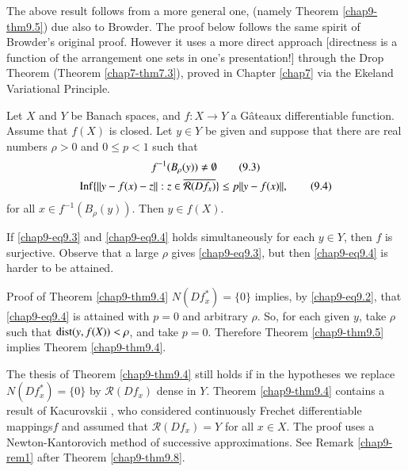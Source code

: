 The above result follows from a more general one, (namely Theorem
\ref{chap9-thm9.5}) due also to Browder. The proof below follows the
same spirit of Browder's original proof. However it uses a more direct
approach [directness is a function of the arrangement one sets in
  one's presentation!] through the Drop Theorem (Theorem
\ref{chap7-thm7.3}), proved in Chapter \ref{chap7} via the Ekeland
Variational Principle. 


\begin{theorem}\label{chap9-thm9.5}
Let $X$ and $Y$ be Banach spaces, and $f:X\to Y$ a G\^ateaux
differentiable function. Assume that $f(X)$ is closed. Let $y\in Y$ be
given and suppose that there are real numbers $\rho>0$ and $0\leq p<1$
such that
\begin{gather*}
f^{-1}(B_{\rho}(y))\neq \emptyset\tag{9.3}\label{chap9-eq9.3}\\
\operatorname{Inf}\{||y-f(x)-z||:z\in \overline{\mathcal{R}(Df_{x})}\}\leq
p||y-f(x)||,\tag{9.4}\label{chap9-eq9.4} 
\end{gather*}
for all $x\in f^{-1}(B_{\rho}(y))$. Then $y\in f(X)$.
\end{theorem}

\setcounter{remark}{0}
\begin{remark}\label{chap9-rem1}
If \eqref{chap9-eq9.3} and \eqref{chap9-eq9.4} holds simultaneously
for each $y\in Y$, then $f$ is surjective. Observe that a large $\rho$
gives \eqref{chap9-eq9.3}, but then \eqref{chap9-eq9.4} is harder to
be attained.
\end{remark}

\begin{remark}\label{chap9-rem2}
Proof of Theorem \ref{chap9-thm9.4} $N(Df^{*}_{x})=\{0\}$ implies, by
\eqref{chap9-eq9.2}, that \eqref{chap9-eq9.4} is attained with $p=0$
and arbitrary $\rho$. So, for each given $y$, take $\rho$ such that
$\operatorname{dist}(y,f(X))<\rho$, and take $p=0$. Therefore Theorem
\ref{chap9-thm9.5} implies Theorem \ref{chap9-thm9.4}.
\end{remark}

\begin{remark}\label{chap9-rem3}
The thesis of Theorem \ref{chap9-thm9.4} still holds if in the
hypotheses we replace $N(Df^{*}_{x})=\{0\}$ by $\mathcal{R}(Df_{x})$
dense in $Y$. Theorem \ref{chap9-thm9.4} contains a result of
Kacurovskii \cite{key35}, who considered continuously Frechet
differentiable mappings\pageoriginale $f$ and assumed that
$\mathcal{R}(Df_{x})=Y$ for all $x\in X$. The proof uses a
Newton-Kantorovich method of successive approximations. See Remark
\ref{chap9-rem1} after Theorem \ref{chap9-thm9.8}.
\end{remark}

